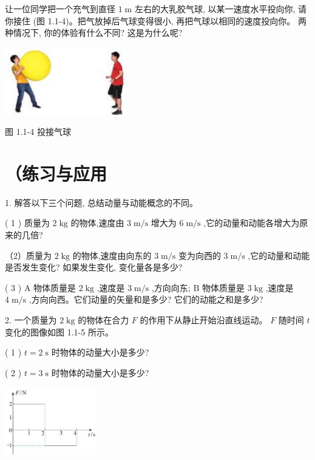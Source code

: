\documentclass[10pt]{article}
\begin{document}
让一位同学把一个充气到直径 \(1\mathrm{\;m}\) 左右的大乳胶气球, 以某一速度水平投向你, 请你接住 (图 1.1-4)。把气放掉后气球变得很小, 再把气球以相同的速度投向你。 两种情况下, 你的体验有什么不同? 这是为什么呢?

\begin{center}
\includegraphics[max width=0.4\textwidth]{images/01910e4c-ebb8-7d2c-8f2f-2375bc1d2d12_10_214795.jpg}
\end{center}

图 1.1-4 投接气球

\section*{（练习与应用}

1. 解答以下三个问题, 总结动量与动能概念的不同。

( 1 ) 质量为 \(2\mathrm{\;{kg}}\) 的物体,速度由 \(3\mathrm{\;m}/\mathrm{s}\) 增大为 \(6\mathrm{\;m}/\mathrm{s}\) ,它的动量和动能各增大为原来的几倍?

（2）质量为 \(2\mathrm{\;{kg}}\) 的物体,速度由向东的 \(3\mathrm{\;m}/\mathrm{s}\) 变为向西的 \(3\mathrm{\;m}/\mathrm{s}\) ,它的动量和动能是否发生变化? 如果发生变化, 变化量各是多少?

( 3 ) A 物体质量是 \(2\mathrm{\;{kg}}\) ,速度是 \(3\mathrm{\;m}/\mathrm{s}\) ,方向向东; \(\mathrm{B}\) 物体质量是 \(3\mathrm{\;{kg}}\) ,速度是 \(4\mathrm{\;m}/\mathrm{s}\) ,方向向西。它们动量的矢量和是多少? 它们的动能之和是多少?

2. 一个质量为 \(2\mathrm{\;{kg}}\) 的物体在合力 \(F\) 的作用下从静止开始沿直线运动。 \(F\) 随时间 \(t\) 变化的图像如图 1.1-5 所示。

( 1 ) \(t = 2\mathrm{\;s}\) 时物体的动量大小是多少?

( 2 ) \(t = 3\mathrm{\;s}\) 时物体的动量大小是多少?

\begin{center}
\includegraphics[max width=0.3\textwidth]{images/01910e4c-ebb8-7d2c-8f2f-2375bc1d2d12_10_425998.jpg}
\end{center}
\end{document}
